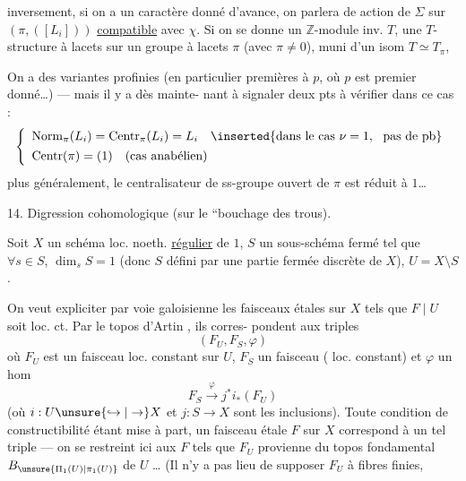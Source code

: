 

inversement, si on a un caractère  donné d'avance,
on parlera de  action de $\Sigma$ sur $(\pi,([L_i]))$
\uline{compatible} avec $\chi$. Si on se donne un
$\mathbb Z$-module inv. $T$, une $T$-structure à lacets
sur un groupe à lacets $\pi$ (avec $\pi\ne0$), muni
d'un isom $T\simeq T_\pi$, 

On a des variantes profinies
(en particulier premières à $p$, où $p$ est premier
donné\dots) --- mais il y a dès mainte-
nant à signaler deux pts à vérifier dans
ce cas :
\[
\left\{
\begin{array}{l}
\operatorname{Norm}_{\pi}(L_i)=\operatorname{Centr}_{\pi}(L_i)=L_i
\quad\inserted{\text{dans le cas }\nu=1,\ \text{ pas de pb}}\\[4pt]
\operatorname{Centr}(\pi)=(1)\quad(\text{cas anabélien})
\end{array}
\right.
\]
plus généralement, le centralisateur
de  ss-groupe ouvert de $\pi$
est réduit à $1$\dots
{}



14. Digression cohomologique (sur le ``bouchage des
trous).

Soit $X$ un schéma loc. noeth. \uline{régulier} de
 $1$, $S$ un sous-schéma fermé  tel que
$\forall s\in S$, $\dim_s S=1$ (donc $S$ défini par une
partie fermée discrète de $X$), $U=X\setminus S$.

On veut expliciter par voie galoisienne les
faisceaux  étales  sur $X$ tels que $F\mid U$ soit
loc. ct. Par le topos d'Artin , ils corres-
pondent aux triples
\[
(F_U,F_S,\varphi)
\]
où $F_U$ est un faisceau  loc. constant sur $U$,
$F_S$ un faisceau ( loc. constant)
et $\varphi$ un hom
\[
F_S\xrightarrow{\varphi}j^{*}i_{*}(F_U)
\]
(où $i:U\unsure{\hookrightarrow|\to}X$ et $j:S\to X$ sont les inclusions).
Toute condition de constructibilité étant mise à
part, un faisceau étale $F$ sur $X$ correspond
à un tel triple --- on se restreint ici aux
$F$ tels que $F_U$  provienne du
topos fondamental $B_{\unsure{\Pi_1(U)|\pi_1(U)}}$ de $U$ \dots
(Il n'y a pas lieu de supposer $F_U$ à fibres finies,

